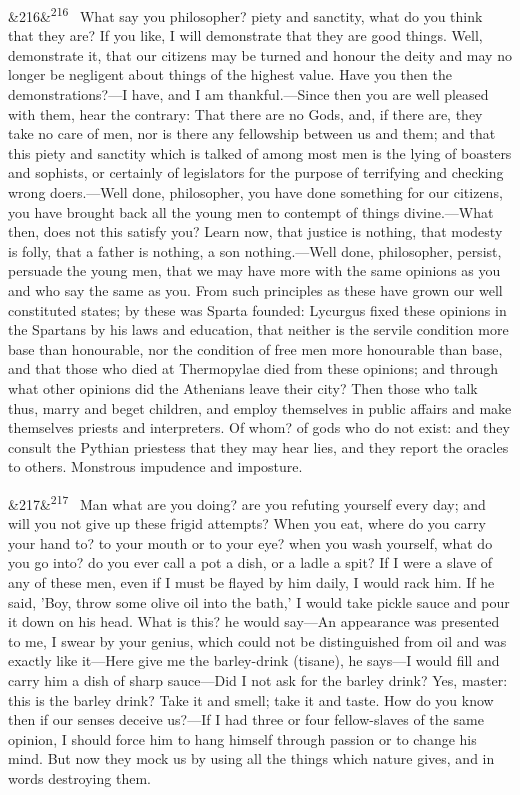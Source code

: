 \documentclass[12pt]{article}
\newcommand{\para}[1][]{\par\noindent\ifx&#1&\else\textsuperscript{\footnotesize #1}~\fi}
\begin{document}
\para[216] What say you philosopher? piety and sanctity, what do you think that they are? If you like, I will demonstrate that they are good things. Well, demonstrate it, that our citizens may be turned and honour the deity and may no longer be negligent about things of the highest value. Have you then the demonstrations?—I have, and I am thankful.—Since then you are well pleased with them, hear the contrary: That there are no Gods, and, if there are, they take no care of men, nor is there any fellowship between us and them; and that this piety and sanctity which is talked of among most men is the lying of boasters and sophists, or certainly of legislators for the purpose of terrifying and checking wrong doers.—Well done, philosopher, you have done something for our citizens, you have brought back all the young men to contempt of things divine.—What then, does not this satisfy you? Learn now, that justice is nothing, that modesty is folly, that a father is nothing, a son nothing.—Well done, philosopher, persist, persuade the young men, that we may have more with the same opinions as you and who say the same as you. From such principles as these have grown our well constituted states; by these was Sparta founded: Lycurgus fixed these opinions in the Spartans by his laws and education, that neither is the servile condition more base than honourable, nor the condition of free men more honourable than base, and that those who died at Thermopylae died from these opinions; and through what other opinions did the Athenians leave their city? Then those who talk thus, marry and beget children, and employ themselves in public affairs and make themselves priests and interpreters. Of whom? of gods who do not exist: and they consult the Pythian priestess that they may hear lies, and they report the oracles to others. Monstrous impudence and imposture.

\para[217] Man what are you doing? are you refuting yourself every day; and will you not give up these frigid attempts? When you eat, where do you carry your hand to? to your mouth or to your eye? when you wash yourself, what do you go into? do you ever call a pot a dish, or a ladle a spit? If I were a slave of any of these men, even if I must be flayed by him daily, I would rack him. If he said, 'Boy, throw some olive oil into the bath,' I would take pickle sauce and pour it down on his head. What is this? he would say—An appearance was presented to me, I swear by your genius, which could not be distinguished from oil and was exactly like it—Here give me the barley-drink (tisane), he says—I would fill and carry him a dish of sharp sauce—Did I not ask for the barley drink? Yes, master: this is the barley drink? Take it and smell; take it and taste. How do you know then if our senses deceive us?—If I had three or four fellow-slaves of the same opinion, I should force him to hang himself through passion or to change his mind. But now they mock us by using all the things which nature gives, and in words destroying them.
\end{document}
